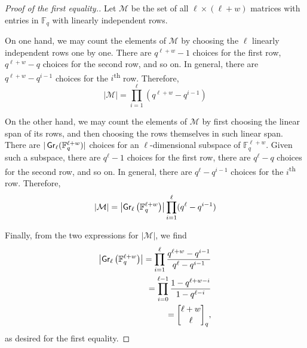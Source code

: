 \begin{proof}[Proof of the first equality.]
    Let \(\mathcal{M}\) be the set of all \(\ell \times (\ell + w)\) matrices with entries in \(\mathbb{F}_q\) with linearly independent rows.

    On one hand, we may count the elements of \(\mathcal{M}\) by choosing the \(\ell\) linearly independent rows one by one.
    There are \(q^{\ell + w} - 1\) choices for the first row,
    \(q^{\ell + w} - q\) choices for the second row, and so on.
    In general, there are \(q^{\ell + w} - q^{i-1}\) choices for the \(i\)\textsuperscript{th} row.
    Therefore,
    \begin{equation*}
        \left|
            \mathcal{M}
        \right|
        = \prod_{i=1}^{\ell} (q^{\ell + w} - q^{i-1})
    \end{equation*}

    On the other hand, we may count the elements of \(\mathcal{M}\) by first choosing the linear span of its rows, and then choosing the rows themselves in such linear span.
    There are \(|\operatorname{\mathsf{Gr}}_\ell(\mathbb{F}_q^{\ell + w})|\) choices for an \(\ell\)-dimensional subspace of \(\mathbb{F}_q^{\ell + w}\).
    Given such a subspace,
    there are \(q^{\ell} - 1\) choices for the first row,
    there are \(q^{\ell} - q\) choices for the second row, and so on.
    In general, there are \(q^{\ell} - q^{i-1}\) choices for the \(i\)\textsuperscript{th} row.
    Therefore,
    \begin{equation*}
        \left|
            \mathcal{M}
        \right|
        = \left|
            \operatorname{\mathsf{Gr}}_\ell\left(\mathbb{F}_{q}^{\ell + w} \right)
        \right|
        \prod_{i=1}^{\ell} (q^{\ell} - q^{i-1})
    \end{equation*}

    Finally, from the two expressions for \(\left| \mathcal{M} \right|\), we find
    \begin{align*}
        \left|
            \Grassmanian_\ell\left(\mathbb{F}_{q}^{\ell + w} \right)
        \right|
        = \prod_{i=1}^{\ell} \frac{q^{\ell + w} - q^{i-1}}{q^{\ell} - q^{i-1}} \\
        = \prod_{i=0}^{\ell - 1} \frac{1 - q^{\ell + w - i}}{1 - q^{\ell - i}} \\
        = \qbinom{\ell + w}{\ell},
    \end{align*}
    as desired for the first equality.
\end{proof}

